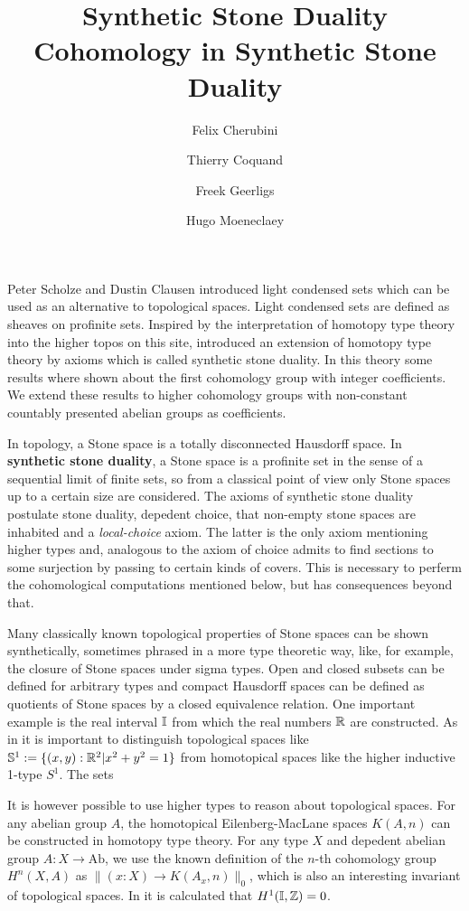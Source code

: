 \documentclass{../util/zariski}
\title{Synthetic Stone Duality 
}
\author{
Felix Cherubini %
\and 
 Thierry Coquand%
\and 
 Freek Geerligs%
\and
 Hugo Moeneclaey %
}
\title{Cohomology in Synthetic Stone Duality}
\begin{document}
\maketitle
Peter Scholze and Dustin Clausen \cite{Scholze} introduced light condensed sets which can be used as an alternative to topological spaces. Light condensed sets are defined as sheaves on profinite sets.
Inspired by the interpretation of homotopy type theory into the higher topos on this site, \cite{synthetic-stone-duality} introduced an extension of homotopy type theory by axioms which is called synthetic stone duality. In this theory some results where shown about the first cohomology group with integer coefficients. We extend these results to higher cohomology groups with non-constant countably presented abelian groups as coefficients.

In topology, a Stone space is a totally disconnected Hausdorff space. In \textbf{synthetic stone duality}, a Stone space is a profinite set in the sense of a sequential limit of finite sets, so from a classical point of view only Stone spaces up to a certain size are considered. The axioms of synthetic stone duality postulate stone duality, depedent choice, that non-empty stone spaces are inhabited and a \emph{local-choice} axiom. The latter is the only axiom mentioning higher types and, analogous to the axiom of choice admits to find sections to some surjection by passing to certain kinds of covers. This is necessary to perferm the cohomological computations mentioned below, but has consequences beyond that.

Many classically known topological properties of Stone spaces can be shown synthetically, sometimes phrased in a more type theoretic way, like, for example, the closure of Stone spaces under sigma types.
Open and closed subsets can be defined for arbitrary types and compact Hausdorff spaces can be defined as quotients of Stone spaces by a closed equivalence relation.
One important example is the real interval $\mathbb{I}$ from which the real numbers $\mathbb{R}$ are constructed.
As in \cite{shulman-Brouwer-fixed-point} it is important to distinguish topological spaces like $\mathbb{S}^1:=\{(x,y):\mathbb{R}^2\vert x^2+y^2=1\}$ from homotopical spaces like the higher inductive 1-type $S^1$.
The sets

It is however possible to use higher types to reason about topological spaces.
For any abelian group $A$, the homotopical Eilenberg-MacLane spaces $K(A,n)$ can be constructed in homotopy type theory. For any type $X$ and depedent abelian group $A:X\to \mathrm{Ab}$, we use the known definition of the $n$-th cohomology group $H^n(X,A)$ as $\|(x:X)\to K(A_x,n)\|_0$, which is also an interesting invariant of topological spaces. In \cite{synthetic-stone-duality} it is calculated that $H^1(\mathbb{I},\mathbb{Z})=0$.
\end{document}
